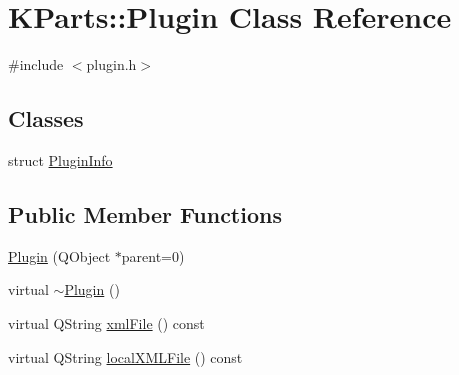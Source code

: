 \hypertarget{classKParts_1_1Plugin}{\section{\-K\-Parts\-:\-:\-Plugin \-Class \-Reference}
\label{classKParts_1_1Plugin}
}


{\ttfamily \#include $<$plugin.\-h$>$}

\subsection*{\-Classes}
\begin{DoxyCompactItemize}
\item 
struct \hyperlink{structKParts_1_1Plugin_1_1PluginInfo}{\-Plugin\-Info}
\end{DoxyCompactItemize}
\subsection*{\-Public \-Member \-Functions}
\begin{DoxyCompactItemize}
\item 
\hyperlink{classKParts_1_1Plugin_ab9f6924150a0a8ec941f4e81ba22311b}{\-Plugin} (\-Q\-Object $\ast$parent=0)
\item 
virtual \hyperlink{classKParts_1_1Plugin_a8a31c0e95c1a8c467a8f22f0da9022ff}{$\sim$\-Plugin} ()
\item 
virtual \-Q\-String \hyperlink{classKParts_1_1Plugin_aef2c9fe874cea1c76e17418fee2a0268}{xml\-File} () const 
\item 
virtual \-Q\-String \hyperlink{classKParts_1_1Plugin_a5d409b39746290ef1606840ea1cb15d8}{local\-X\-M\-L\-File} () const 
\end{DoxyCompactItemize}
